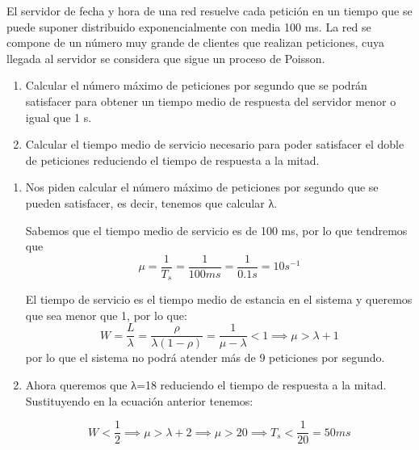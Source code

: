 \begin{problem}[9]
El servidor de fecha y hora de una red resuelve cada petición en un tiempo que se puede suponer distribuido exponencialmente con media 100 ms. La red se compone de un número muy grande de clientes que realizan peticiones, cuya llegada al servidor se considera que sigue un proceso de Poisson.
\begin{enumerate}
\item Calcular el número máximo de peticiones por segundo que se podrán satisfacer para obtener un tiempo medio de respuesta del servidor menor o igual que 1 s.
\item Calcular el tiempo medio de servicio necesario para poder satisfacer el doble de peticiones reduciendo el tiempo de respuesta a la mitad.

\end{enumerate}

\solution

\begin{enumerate}
\item Nos piden calcular el número máximo de peticiones por segundo que se pueden satisfacer, es decir, tenemos que calcular λ.

Sabemos que el tiempo medio de servicio es de 100 ms, por lo que tendremos que
\[μ = \frac{1}{T_s}=\frac{1}{100 ms} = \frac{1}{0.1s}=10s^{-1}\]

El tiempo de servicio es el tiempo medio de estancia en el sistema y queremos que sea menor que 1, por lo que:
\[W=\frac{L}{λ}=\frac{\rho}{λ(1-\rho)}=\frac{1}{μ-λ} < 1 \implies μ > λ +1\]
por lo que el sistema no podrá atender más de 9 peticiones por segundo.

\item Ahora queremos que λ=18 reduciendo el tiempo de respuesta a la mitad. Sustituyendo en la ecuación anterior tenemos:

\[W < \frac{1}{2} \implies μ > λ +2 \implies μ > 20 \implies T_s < \frac{1}{20} = 50 ms\]
\end{enumerate}

\end{problem}


